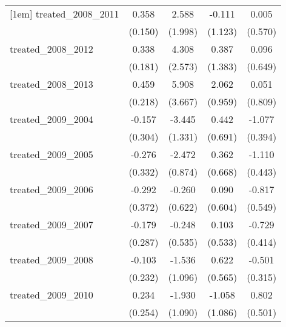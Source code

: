 {\begin{tabular}{l*{4}{c}}
[1em]
treated\_2008\_2011&       0.358\sym{*}  &       2.588         &      -0.111         &       0.005         \\
            &     (0.150)         &     (1.998)         &     (1.123)         &     (0.570)         \\
[1em]
treated\_2008\_2012&       0.338         &       4.308         &       0.387         &       0.096         \\
            &     (0.181)         &     (2.573)         &     (1.383)         &     (0.649)         \\
[1em]
treated\_2008\_2013&       0.459\sym{*}  &       5.908         &       2.062\sym{*}  &       0.051         \\
            &     (0.218)         &     (3.667)         &     (0.959)         &     (0.809)         \\
[1em]
treated\_2009\_2004&      -0.157         &      -3.445\sym{**} &       0.442         &      -1.077\sym{**} \\
            &     (0.304)         &     (1.331)         &     (0.691)         &     (0.394)         \\
[1em]
treated\_2009\_2005&      -0.276         &      -2.472\sym{**} &       0.362         &      -1.110\sym{*}  \\
            &     (0.332)         &     (0.874)         &     (0.668)         &     (0.443)         \\
[1em]
treated\_2009\_2006&      -0.292         &      -0.260         &       0.090         &      -0.817         \\
            &     (0.372)         &     (0.622)         &     (0.604)         &     (0.549)         \\
[1em]
treated\_2009\_2007&      -0.179         &      -0.248         &       0.103         &      -0.729         \\
            &     (0.287)         &     (0.535)         &     (0.533)         &     (0.414)         \\
[1em]
treated\_2009\_2008&      -0.103         &      -1.536         &       0.622         &      -0.501         \\
            &     (0.232)         &     (1.096)         &     (0.565)         &     (0.315)         \\
[1em]
treated\_2009\_2010&       0.234         &      -1.930         &      -1.058         &       0.802         \\
            &     (0.254)         &     (1.090)         &     (1.086)         &     (0.501)         \\

\end{tabular}}
